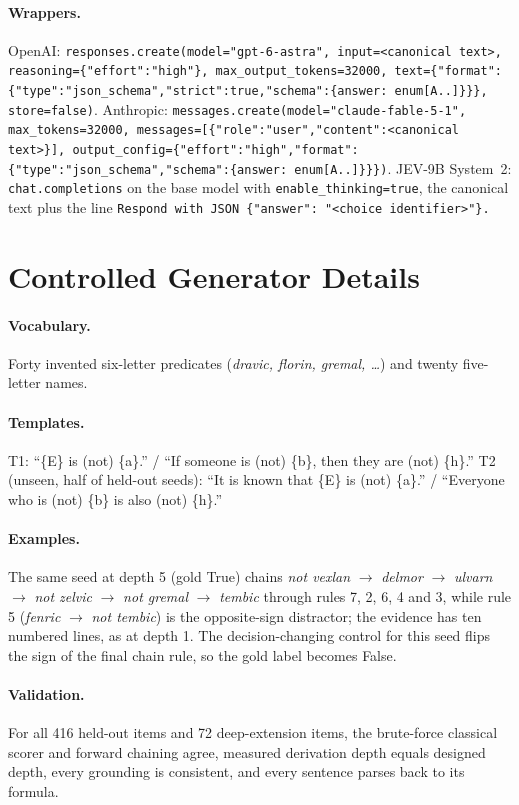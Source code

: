 \paragraph{Wrappers.}
OpenAI: \texttt{responses.create(model="gpt-6-astra", input=<canonical text>, reasoning=\{"effort":"high"\}, max\_output\_tokens=32000, text=\{"format":\{"type":"json\_schema","strict":true,"schema":\{answer: enum[A..]\}\}\}, store=false)}.
Anthropic: \texttt{messages.create(model="claude-fable-5-1", max\_tokens=32000, messages=[\{"role":"user","content":<canonical text>\}], output\_config=\{"effort":"high","format":\{"type":"json\_schema","schema":\{answer: enum[A..]\}\}\})}.
JEV-9B System~2: \texttt{chat.completions} on the base model with \texttt{enable\_thinking=true}, the canonical text plus the line \texttt{Respond with JSON \{"answer": "<choice identifier>"\}.}

\section{Controlled Generator Details}
\label{app:generator}
\paragraph{Vocabulary.} Forty invented six-letter predicates (\textit{dravic, florin, gremal, \ldots}) and twenty five-letter names.
\paragraph{Templates.} T1: ``\{E\} is (not) \{a\}.'' / ``If someone is (not) \{b\}, then they are (not) \{h\}.'' T2 (unseen, half of held-out seeds): ``It is known that \{E\} is (not) \{a\}.'' / ``Everyone who is (not) \{b\} is also (not) \{h\}.''
\paragraph{Examples.} The same seed at depth 5 (gold True) chains \textit{not vexlan} $\to$ \textit{delmor} $\to$ \textit{ulvarn} $\to$ \textit{not zelvic} $\to$ \textit{not gremal} $\to$ \textit{tembic} through rules 7, 2, 6, 4 and 3, while rule 5 (\textit{fenric} $\to$ \textit{not tembic}) is the opposite-sign distractor; the evidence has ten numbered lines, as at depth 1.
The decision-changing control for this seed flips the sign of the final chain rule, so the gold label becomes False.
\paragraph{Validation.} For all 416 held-out items and 72 deep-extension items, the brute-force classical scorer and forward chaining agree, measured derivation depth equals designed depth, every grounding is consistent, and every sentence parses back to its formula.

